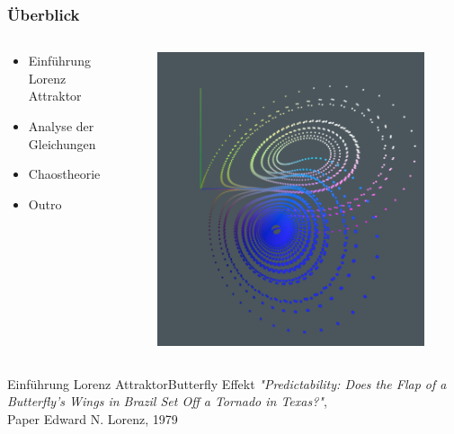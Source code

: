 \documentclass[presentation.tex]{subfiles}
\begin{document}
	\frame{\titlepage}
    
    \begin{frame}
        \frametitle{Überblick}
        \begin{columns}
        	\begin{column}{0.6\linewidth}
        		\begin{itemize}
        			\item Einführung Lorenz Attraktor
        			\item Analyse der Gleichungen
        			\item Chaostheorie
        			\item Outro
        		\end{itemize}
        	\end{column}
        	\begin{column}{0.4\linewidth}
        		\begin{figure}
				\centering
				\includegraphics[width=0.7\linewidth]{../outline/lorenz-modell}
				\label{fig:lorenz-modell}
				\end{figure}
        	\end{column}
        \end{columns}
    \end{frame}
    
    \begin{frame}{Einführung Lorenz Attraktor}{Butterfly Effekt}
		\textit{"Predictability: Does the Flap of a Butterfly's Wings in Brazil Set Off a Tornado in Texas?"}, \\
		Paper Edward N. Lorenz, 1979
    \end{frame}
    
\end{document}
